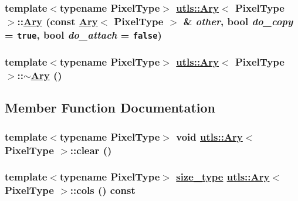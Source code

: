 \hypertarget{structutls_1_1Ary_949d8ece6fb57dd9e190ac9b2b3eabe6}{
\subsubsection[Ary]{\setlength{\rightskip}{0pt plus 5cm}template$<$typename Pixel\-Type$>$ \hyperlink{structutls_1_1Ary}{utls::Ary}$<$ Pixel\-Type $>$::\hyperlink{structutls_1_1Ary}{Ary} (const \hyperlink{structutls_1_1Ary}{Ary}$<$ Pixel\-Type $>$ \& {\em other}, bool {\em do\_\-copy} = {\tt true}, bool {\em do\_\-attach} = {\tt false})}}
\label{structutls_1_1Ary_949d8ece6fb57dd9e190ac9b2b3eabe6}


\hypertarget{structutls_1_1Ary_87106fce9be66a0532f3ae8a61fbd782}{
\subsubsection[$\sim$Ary]{\setlength{\rightskip}{0pt plus 5cm}template$<$typename Pixel\-Type$>$ \hyperlink{structutls_1_1Ary}{utls::Ary}$<$ Pixel\-Type $>$::$\sim$\hyperlink{structutls_1_1Ary}{Ary} ()}}
\label{structutls_1_1Ary_87106fce9be66a0532f3ae8a61fbd782}




\subsection{Member Function Documentation}
\hypertarget{structutls_1_1Ary_2e905f4c6d346e123ed372fcea624c59}{
\subsubsection[clear]{\setlength{\rightskip}{0pt plus 5cm}template$<$typename Pixel\-Type$>$ void \hyperlink{structutls_1_1Ary}{utls::Ary}$<$ Pixel\-Type $>$::clear ()}}
\label{structutls_1_1Ary_2e905f4c6d346e123ed372fcea624c59}


\hypertarget{structutls_1_1Ary_1bc272d4ce305a76fad63a9d9a0ed233}{
\subsubsection[cols]{\setlength{\rightskip}{0pt plus 5cm}template$<$typename Pixel\-Type$>$ \hyperlink{structutls_1_1Ary_8811de4f35f83e989511aaddf003376c}{size\_\-type} \hyperlink{structutls_1_1Ary}{utls::Ary}$<$ Pixel\-Type $>$::cols () const}}
\label{structutls_1_1Ary_1bc272d4ce305a76fad63a9d9a0ed233}


